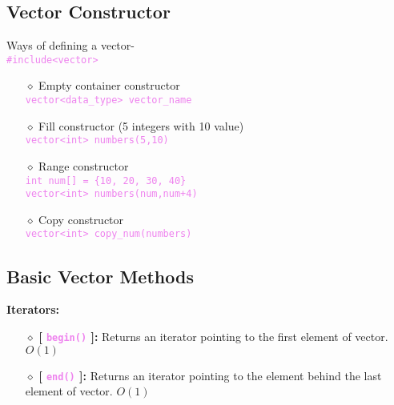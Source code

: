 \subsection{Vector Constructor}
Ways of defining a vector-\\
	\tab\tab\textcolor{violet}{\texttt{\#include<vector>}}
\begin{itemize}
	\item[{\LARGE$\diamond$}] Empty container constructor\\
		\tab\textcolor{violet}{\texttt{vector<data\_type> vector\_name}}
		
	\item[{\LARGE$\diamond$}] Fill constructor (5 integers with 10 value)\\
		\tab\textcolor{violet}{\texttt{vector<int> numbers(5,10)}}
		
	\item[{\LARGE$\diamond$}] Range constructor\\
		\tab\textcolor{violet}{\texttt{int num[] = \{10, 20, 30, 40\}}}\\
		\tab\textcolor{violet}{\texttt{vector<int> numbers(num,num+4)}}
		
	\item[{\LARGE$\diamond$}] Copy constructor\\
		\tab\textcolor{violet}{\texttt{vector<int> copy\_num(numbers)}}
\end{itemize}

\subsection{Basic Vector Methods}

\begin{center}
	\textbf{Iterators:}
\end{center}
\begin{itemize}

	\item[{\LARGE $\diamond$}] \textbf{[ \textcolor{violet}{\texttt{begin()}} ]:} Returns an iterator pointing to the first element of vector. $O(1)$
	
	\item[{\LARGE $\diamond$}] \textbf{[ \textcolor{violet}{\texttt{end()}} ]:} Returns an iterator pointing to the element behind the last element of vector.	$O(1)$
	
\end{itemize}

